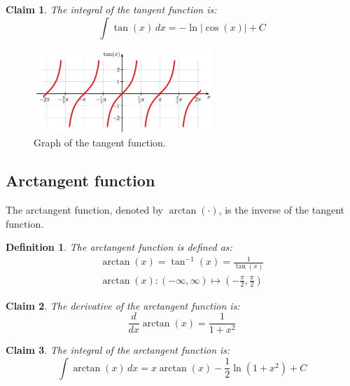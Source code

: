 \documentclass[11pt]{book} %
\newtheorem{definition}{Definition}[section]
\newtheorem*{claim*}{Claim}
\begin{document}
\begin{claim*}
    The integral of the tangent function is:
    \begin{equation}
        \int \tan(x) \, dx = -\ln|\cos(x)| + C
    \end{equation}
\end{claim*}

\begin{figure}[h]
    \centering
    \includegraphics[width=0.6\textwidth]{Figs/tangent.png }
    \caption{Graph of the tangent function.}
    \label{fig:tangent}
\end{figure}

\subsection{Arctangent function}
The arctangent function, denoted by \(\arctan(\cdot)\), is the inverse of the tangent function.

\begin{definition}
    The arctangent function is defined as:
    \begin{align*}
        \arctan(x) = \tan^{-1}(x) = \frac{1}{\tan(x)} \\
        \arctan(x) : \left(-\infty, \infty\right) \mapsto \left(-\frac{\pi}{2}, \frac{\pi}{2}\right)
    \end{align*}
\end{definition}

\begin{claim*}
    The derivative of the arctangent function is:
    \begin{equation}
        \frac{d}{dx} \arctan(x) = \frac{1}{1 + x^2}
    \end{equation}
\end{claim*}

\begin{claim*}
    The integral of the arctangent function is:
    \begin{equation}
        \int \arctan(x) \, dx = x \arctan(x) - \frac{1}{2} \ln(1 + x^2) + C
    \end{equation}
\end{claim*}
\end{document}
